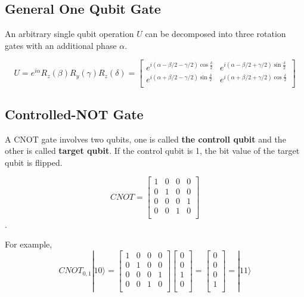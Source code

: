 \subsection{General One Qubit Gate}

An arbitrary single qubit operation $U$ can be decomposed into three rotation gates with an additional phase $\alpha$.

\begin{equation}
 U = e^{i \alpha}R_z(\beta)R_y(\gamma)R_z(\delta) = \begin{bmatrix}
    e^{i (\alpha-\beta/2-\gamma/2)\cos\frac{\delta}{2}} & e^{i (\alpha-\beta/2+\gamma/2)\sin\frac{\delta}{2}}  \\
    e^{i (\alpha+\beta/2-\gamma/2)\sin\frac{\delta}{2}}  & e^{i (\alpha+\beta/2+\gamma/2)\cos\frac{\delta}{2}}  \\
    \end{bmatrix} 
\end{equation}

\subsection{Controlled-NOT Gate}
A CNOT gate involves two qubits, one is called \textbf{the controll qubit} and the other is called \textbf{target qubit}.  If the control qubit is 1, the bit value of the target qubit is flipped.

\begin{equation}
CNOT = \begin{bmatrix}
1 & 0 & 0 & 0 \\
0 & 1 & 0 & 0 \\
0 & 0 & 0 & 1 \\
0 & 0 & 1 & 0 \\
\end{bmatrix}
\end{equation}.

For example,
\begin{equation}
CNOT_{0,1}|10\rangle = 
\begin{bmatrix}
1 & 0 & 0 & 0 \\
0 & 1 & 0 & 0 \\
0 & 0 & 0 & 1 \\
0 & 0 & 1 & 0 \\
\end{bmatrix}
 \left[
\begin{array}{c}
0 \\
0 \\
1 \\
0 \\
\end{array}
\right]
=  \left[
\begin{array}{c}
0 \\
0 \\
0 \\
1 \\
\end{array}
\right] 
= |11\rangle 
\end{equation}


